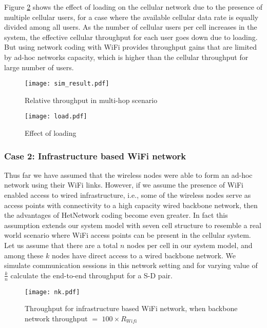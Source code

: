 \documentclass{sig-alternate-10pt}
\begin{document}
Figure \ref{fig:load} shows the effect of loading on the cellular network due to the presence of multiple cellular users, for a case where the available cellular data rate is equally divided among all users. As the number of cellular users per cell increases in the system, the effective cellular throughput for each user goes down due to loading. But using  network coding with WiFi provides throughput gains that are limited by ad-hoc networks capacity, which is higher than the cellular throughput for large number of users.


\begin{figure}[t]
\texttt{[image: sim\_result.pdf]}
\caption{Relative throughput in multi-hop scenario}
\label{fig:rate}
\end{figure}

\begin{figure}[t]
\texttt{[image: load.pdf]}
\caption{Effect of loading}
\label{fig:load}
\end{figure}


\subsubsection{Case 2: Infrastructure based WiFi network}
Thus far we have assumed that the wireless nodes were able to form an ad-hoc network using their WiFi links. However, if we assume the presence of WiFi enabled access to wired infrastructure, i.e., some of the wireless nodes serve as access points with connectivity to a high capacity wired backbone network, then the advantages of HetNetwork coding become even greater. In fact this assumption  extends our system model with seven cell structure to resemble a  real world scenario where WiFi access points can be present in the cellular system. Let us assume that there are a total $n$ nodes per cell in  our system model, and among these $k$ nodes have direct access to a wired backbone network. We simulate communication sessions in this network setting and for varying value of $\frac{k}{n}$ calculate the end-to-end throughput for a S-D pair.
\begin{figure}[t]
\texttt{[image: nk.pdf]}
\caption{Throughput for infrastructure based WiFi network, when backbone network throughput  $=$ $100\times R_{Wifi}$}
\label{fig:nk}
\end{figure}
\end{document}
